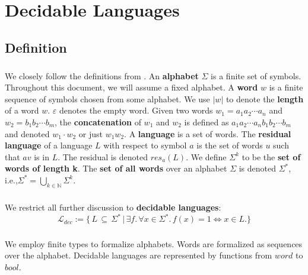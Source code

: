 \chapter{Decidable Languages}

\section{Definition}
\paragraph{}
We closely follow the definitions from \cite{DBLP:books/daglib/0011126}.
An \textbf{alphabet} $\Sigma$ is a finite set of symbols. Throughout this document, we will assume a fixed alphabet.
A \textbf{word} $w$ is a finite sequence of symbols chosen from some alphabet. 
We use $|w|$ to denote the \textbf{length} of a word $w$. $\varepsilon$ denotes the empty word.
Given two words $w_1 = a_1 a_2 \cdots a_n$ and $w_2 = b_1 b_2 \cdots b_m$, the \textbf{concatenation} of $w_1$ and $w_2$ is defined as $a_1 a_2 \cdots a_n b_1 b_2 \cdots b_m$ and denoted $w_1 \cdot w_2$ or just $w_1 w_2$.
A \textbf{language} is a set of words.
The \textbf{residual language} of a language $L$ with respect to symbol $a$ is the set of words $u$ such that $a v$ is in $L$. The residual is denoted $res_a(L)$.
We define $\Sigma^k$ to be the \textbf{set of words of length k}.
The \textbf{set of all words} over an alphabet $\Sigma$ is denoted $\Sigma^*$, i.e.,$\Sigma^* = \bigcup_{k \in \mathbb{N}} \Sigma^k$.

\paragraph{} We restrict all further discussion to \textbf{decidable languages}:
\begin{equation*} \mathcal{L}_{dec} := \{ \, L \, \subseteq \, \Sigma^* \, 
    \vert \, \exists f. \, \forall x \in \Sigma^*. \, f(x) = 1 \Leftrightarrow  x \in L. \} \end{equation*} 

    \paragraph{} 
    We employ finite types to formalize alphabets. 
    Words are formalized as sequences over the alphabet.
    Decidable languages are represented by functions from $word$ to $bool$.

